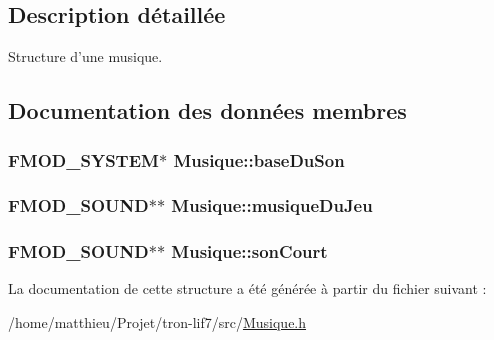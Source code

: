 \subsection{Description détaillée}
Structure d'une musique. 

\subsection{Documentation des données membres}
\hypertarget{structMusique_a5ac7591cc431a2ef548d48e9cf858d94}{
\subsubsection[{base\-Du\-Son}]{\setlength{\rightskip}{0pt plus 5cm}F\-M\-O\-D\-\_\-\-S\-Y\-S\-T\-E\-M$\ast$ Musique\-::base\-Du\-Son}}\label{structMusique_a5ac7591cc431a2ef548d48e9cf858d94}
\hypertarget{structMusique_a442e0e2e689699e3bb72eb8c8e4e14c2}{
\subsubsection[{musique\-Du\-Jeu}]{\setlength{\rightskip}{0pt plus 5cm}F\-M\-O\-D\-\_\-\-S\-O\-U\-N\-D$\ast$$\ast$ Musique\-::musique\-Du\-Jeu}}\label{structMusique_a442e0e2e689699e3bb72eb8c8e4e14c2}
\hypertarget{structMusique_ae957f32de4befa0f625f4b7229e3d660}{
\subsubsection[{son\-Court}]{\setlength{\rightskip}{0pt plus 5cm}F\-M\-O\-D\-\_\-\-S\-O\-U\-N\-D$\ast$$\ast$ Musique\-::son\-Court}}\label{structMusique_ae957f32de4befa0f625f4b7229e3d660}


La documentation de cette structure a été générée à partir du fichier suivant \-:\begin{DoxyCompactItemize}
\item 
/home/matthieu/\-Projet/tron-\/lif7/src/\hyperlink{Musique_8h}{Musique.\-h}\end{DoxyCompactItemize}
